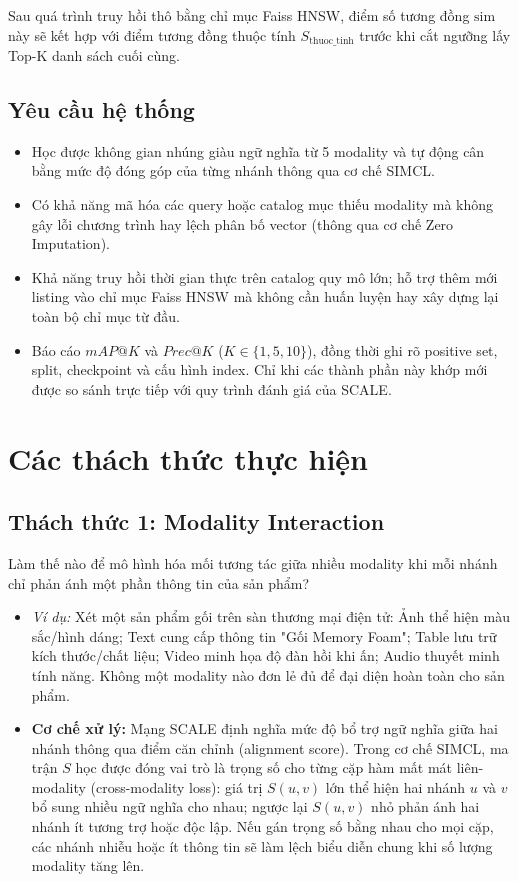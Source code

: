 \documentclass[10pt,conference]{IEEEtran}
\begin{document}
Sau quá trình truy hồi thô bằng chỉ mục Faiss HNSW, điểm số tương đồng $\text{sim}$ này sẽ kết hợp với điểm tương đồng thuộc tính $S_{\text{thuoc\_tinh}}$ trước khi cắt ngưỡng lấy Top-K danh sách cuối cùng.

\subsection{Yêu cầu hệ thống}
\begin{itemize}[leftmargin=*]
    \item Học được không gian nhúng giàu ngữ nghĩa từ 5 modality và tự động cân bằng mức độ đóng góp của từng nhánh thông qua cơ chế SIMCL.
    \item Có khả năng mã hóa các query hoặc catalog mục thiếu modality mà không gây lỗi chương trình hay lệch phân bố vector (thông qua cơ chế Zero Imputation).
    \item Khả năng truy hồi thời gian thực trên catalog quy mô lớn; hỗ trợ thêm mới listing vào chỉ mục Faiss HNSW mà không cần huấn luyện hay xây dựng lại toàn bộ chỉ mục từ đầu.
    \item Báo cáo $mAP@K$ và $Prec@K$ ($K \in \{1, 5, 10\}$), đồng thời ghi rõ positive set, split, checkpoint và cấu hình index. Chỉ khi các thành phần này khớp mới được so sánh trực tiếp với quy trình đánh giá của SCALE.
\end{itemize}

\section{Các thách thức thực hiện}

\subsection{Thách thức 1: Modality Interaction}
Làm thế nào để mô hình hóa mối tương tác giữa nhiều modality khi mỗi nhánh chỉ phản ánh một phần thông tin của sản phẩm?
\begin{itemize}[leftmargin=*]
    \item \textit{Ví dụ:} Xét một sản phẩm gối trên sàn thương mại điện tử: Ảnh thể hiện màu sắc/hình dáng; Text cung cấp thông tin "Gối Memory Foam"; Table lưu trữ kích thước/chất liệu; Video minh họa độ đàn hồi khi ấn; Audio thuyết minh tính năng. Không một modality nào đơn lẻ đủ để đại diện hoàn toàn cho sản phẩm.
    \item \textbf{Cơ chế xử lý:} Mạng SCALE định nghĩa mức độ bổ trợ ngữ nghĩa giữa hai nhánh thông qua điểm căn chỉnh (alignment score). Trong cơ chế SIMCL, ma trận $S$ học được đóng vai trò là trọng số cho từng cặp hàm mất mát liên-modality (cross-modality loss): giá trị $S(u,v)$ lớn thể hiện hai nhánh $u$ và $v$ bổ sung nhiều ngữ nghĩa cho nhau; ngược lại $S(u,v)$ nhỏ phản ánh hai nhánh ít tương trợ hoặc độc lập. Nếu gán trọng số bằng nhau cho mọi cặp, các nhánh nhiễu hoặc ít thông tin sẽ làm lệch biểu diễn chung khi số lượng modality tăng lên.
\end{itemize}
\end{document}
